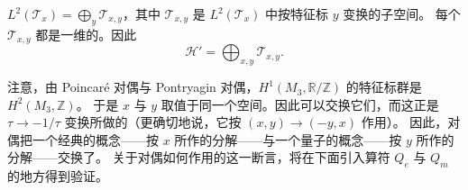 
$L^{2}(\mathcal{T}_{x})=\bigoplus_{y}\mathcal{T}_{x,y}$，其中 $\mathcal{T}_{x,y}$ 是 $L^{2}(\mathcal{T}_{x})$ 中按特征标 $y$ 变换的子空间。
每个 $\mathcal{T}_{x,y}$ 都是一维的。因此
\begin{equation}
  \tag{8.77}
  \label{eq:8-77}
  \mathcal{H}'=\bigoplus_{x,y}\mathcal{T}_{x,y}.
\end{equation}

注意，由 Poincaré 对偶与 Pontryagin 对偶，$H^{1}(M_{3},\mathbb{R}/\mathbb{Z})$ 的特征标群是 $H^{2}(M_{3},\mathbb{Z})$。
于是 $x$ 与 $y$ 取值于同一个空间。因此可以交换它们，而这正是 $\tau\to-1/\tau$ 变换所做的（更确切地说，它按 $(x,y)\to(-y,x)$ 作用）。
因此，对偶把一个经典的概念——按 $x$ 所作的分解——与一个量子的概念——按 $y$ 所作的分解——交换了。
关于对偶如何作用的这一断言，将在下面引入算符 $Q_{e}$ 与 $Q_{m}$ 的地方得到验证。


